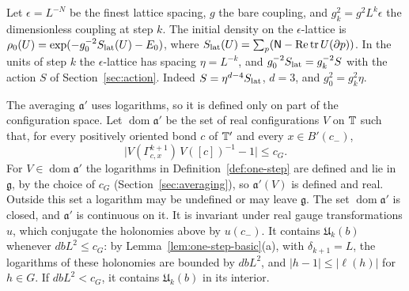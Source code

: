 Let $\epsilon=L^{-N}$ be the finest lattice spacing, $g$ the bare coupling, and $g_k^2=g^2L^k\epsilon$ the dimensionless coupling at step $k$. The initial density on the $\epsilon$-lattice is $\rho_0(U)=\exp(-g_0^{-2}S_{\rm lat}(U)-E_0)$, where $S_{\rm lat}(U)=\sum_p(\mathsf N-\operatorname{Re}\operatorname{tr}U(\partial p))$. In the units of step $k$ the $\epsilon$-lattice has spacing $\eta=L^{-k}$, and $g_0^{-2}S_{\rm lat}=g_k^{-2}S$ with the action $S$ of Section~\ref{sec:action}. Indeed $S=\eta^{d-4}S_{\rm lat}$, $d=3$, and $g_0^2=g_k^2\eta$.

The averaging $\mathfrak a'$ uses logarithms, so it is defined only on part of the configuration space. Let $\operatorname{dom}\mathfrak a'$ be the set of real configurations $V$ on $\mathbb T$ such that, for every positively oriented bond $c$ of $\mathbb T'$ and every $x\in B'(c_-)$,
\[
\big|V(\Gamma^{k+1}_{c,x})\,V([c])^{-1}-1\big|\le c_G .
\]
For $V\in\operatorname{dom}\mathfrak a'$ the logarithms in Definition~\ref{def:one-step} are defined and lie in $\mathfrak g$, by the choice of $c_G$ (Section~\ref{sec:averaging}), so $\mathfrak a'(V)$ is defined and real. Outside this set a logarithm may be undefined or may leave $\mathfrak g$. The set $\operatorname{dom}\mathfrak a'$ is closed, and $\mathfrak a'$ is continuous on it. It is invariant under real gauge transformations $u$, which conjugate the holonomies above by $u(c_-)$. It contains $\mathfrak U_k(b)$ whenever $dbL^2\le c_G$: by Lemma~\ref{lem:one-step-basic}(a), with $\delta_{k+1}=L$, the logarithms of these holonomies are bounded by $dbL^2$, and $|h-1|\le|\ell(h)|$ for $h\in G$. If $dbL^2<c_G$, it contains $\mathfrak U_k(b)$ in its interior.


